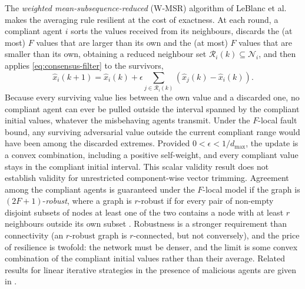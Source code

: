 \documentclass[graybox,envcountchap]{style/SNmono}
\providecommand{\DIFadd}[1]{{\protect\color{blue} #1}} %
\providecommand{\DIFdel}[1]{{\protect\color{red} #1}} %
\providecommand{\DIFaddbegin}{} %
\providecommand{\DIFaddend}{} %
\providecommand{\DIFdelbegin}{} %
\providecommand{\DIFdelend}{} %
\begin{document}
The \emph{weighted mean-subsequence-reduced} (W-MSR) algorithm of LeBlanc et al.\ \cite{leblanc2013_wmsr} makes the averaging rule resilient at the cost of exactness. At each round, a compliant agent $i$ sorts the values received from its neighbours, discards the (at most) $F$ values that are larger than its own and the (at most) $F$ values that are smaller than its own, obtaining a reduced neighbour set $\mathcal{R}_i(k)\subseteq\mathcal{N}_i$, and then applies \eqref{eq:consensus-filter} to the survivors,
\begin{equation}
\widehat{x}_i(k+1)=\widehat{x}_i(k)+\epsilon\sum_{j\in\mathcal{R}_i(k)}\left(\widehat{x}_j(k)-\widehat{x}_i(k)\right).
\label{eq:wmsr}
\end{equation}
\DIFdelbegin \DIFdel{Because every surviving value lies between the own value and a discarded one, no compliant agent can ever be pulled outside the interval spanned by the compliant initial values, whatever the misbehaving agents transmit. }\DIFdelend \DIFaddbegin \DIFadd{Under the $F$-local fault bound, any surviving adversarial value outside the current compliant range would have been among the discarded extremes. Provided $0<\epsilon<1/d_{\max}$, the update is a convex combination, including a positive self-weight, and every compliant value stays in the compliant initial interval. This scalar validity result does not establish validity for unrestricted component-wise vector trimming. }\DIFaddend Agreement among the compliant agents is guaranteed under the $F$-local model if the graph is $(2F+1)$-\emph{robust}, where a graph is $r$-robust if for every pair of non-empty disjoint subsets of nodes at least one of the two contains a node with at least $r$ neighbours outside its own subset \cite{leblanc2013_wmsr}. Robustness is a stronger requirement than connectivity (an $r$-robust graph is $r$-connected, but not conversely), and the price of resilience is twofold: the network must be denser, and the limit is some convex combination of the compliant initial values rather than their average. Related results for linear iterative strategies in the presence of malicious agents are given in \cite{sundaram2011_malicious}.
\end{document}
